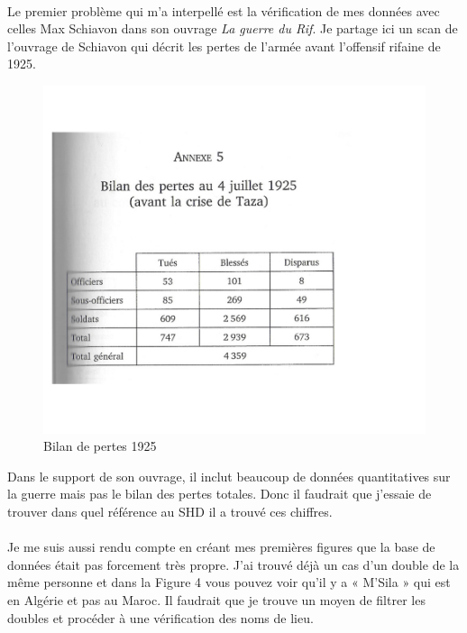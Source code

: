 \documentclass[12pt]{article}
\begin{document}
\paragraph*{}
Le premier problème qui m'a interpellé est la vérification de mes données avec celles Max Schiavon dans son ouvrage \emph{La guerre du Rif}. Je partage ici un scan de l'ouvrage de Schiavon qui décrit les pertes de l'armée avant l'offensif rifaine de 1925.\cite{Schiavon}
\begin{figure}[!htb]
	\centering
    \includegraphics[scale=0.4]{schiavon.jpeg}
    \caption{Bilan de pertes 1925}
    \label{fig:schiavonscan}
\end{figure}  Dans le support de son ouvrage, il inclut beaucoup de données quantitatives sur la guerre mais pas le bilan des pertes totales. Donc il faudrait que j'essaie de trouver dans quel référence au SHD il a trouvé ces chiffres.   

\paragraph*{}
Je me suis aussi rendu compte en créant mes premières figures que la base de données était pas forcement très propre. J'ai trouvé déjà un cas d'un double de la même personne et dans la Figure 4 vous pouvez voir qu'il y a « M'Sila » qui est en Algérie et pas au Maroc. Il faudrait que je trouve un moyen de filtrer les doubles et procéder à une vérification des noms de lieu. 
 
\end{document}
